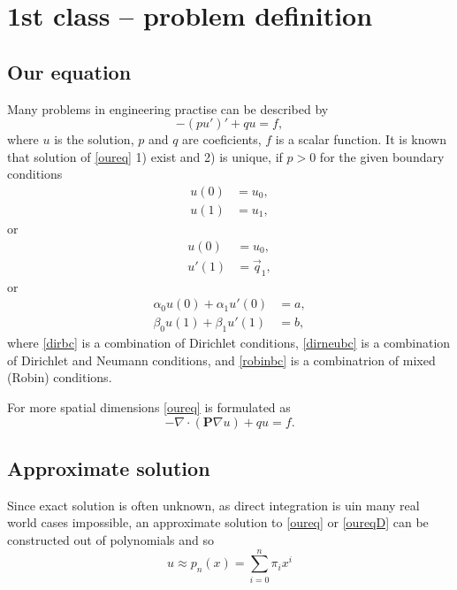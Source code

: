 
\chapter{1st class -- problem definition}

\section{Our equation}

Many problems in engineering practise can be described by 
\begin{equation}
\label{oureq}
 - (p u')' + q u = f,
\end{equation}
 where $u$ is the solution, $p$ and $q$ are coeficients, $f$ is a scalar function.  It is known that solution of \eqref{oureq} 1) exist and 2) is unique, if $p > 0$ for the given boundary conditions
 \begin{equation}
 \label{dirbc}
  \begin{split}
   u(0) &= u_{0}, \\
    u(1) & = u_{1},
  \end{split} 
 \end{equation}
or 
\begin{equation}
\label{dirneubc}
 \begin{split}
      u(0) &= u_{0}, \\
    u'(1) & = \vec{q}_{1},
 \end{split} 
\end{equation}
or 
\begin{equation}
\label{robinbc}
 \begin{split}
  \alpha_{0}u(0) + \alpha_{1}u'(0) &= a ,\\
     \beta_{0}u(1) + \beta_{1}u'(1) &= b ,
 \end{split} 
\end{equation}
where \eqref{dirbc} is a combination of Dirichlet conditions, \eqref{dirneubc} is a combination of Dirichlet and Neumann conditions, and \eqref{robinbc} is a combinatrion of mixed (Robin) conditions.

For more spatial dimensions \eqref{oureq} is formulated as
\begin{equation}
\label{oureqD}
- \nabla \cdot (\mathbf{P} \nabla u)  + qu = f .
\end{equation}

\section{Approximate solution}
Since exact solution is often unknown, as direct integration is uin 
many real world cases  impossible, an approximate solution to \eqref{oureq} or \eqref{oureqD} can be constructed out of polynomials and so
\begin{equation}
\label{bencheq}
 u \approx p_{n}(x) = \sum_{i=0}^{n}\pi_{i} x^{i} 
\end{equation}


